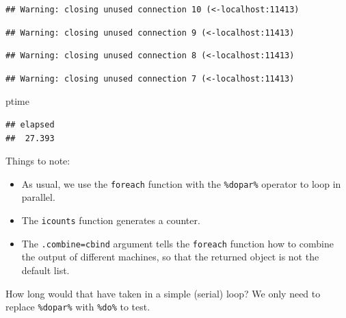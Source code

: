 \documentclass[]{book}
\newenvironment{Shaded}{\begin{snugshade}}{\end{snugshade}}
\newcommand{\KeywordTok}[1]{\textcolor[rgb]{0.13,0.29,0.53}{\textbf{{#1}}}}
\newcommand{\DataTypeTok}[1]{\textcolor[rgb]{0.13,0.29,0.53}{{#1}}}
\newcommand{\DecValTok}[1]{\textcolor[rgb]{0.00,0.00,0.81}{{#1}}}
\newcommand{\StringTok}[1]{\textcolor[rgb]{0.31,0.60,0.02}{{#1}}}
\newcommand{\OtherTok}[1]{\textcolor[rgb]{0.56,0.35,0.01}{{#1}}}
\newcommand{\NormalTok}[1]{{#1}}
\providecommand{\tightlist}{%
  \setlength{\itemsep}{0pt}\setlength{\parskip}{0pt}}
\theoremstyle{definition}
\theoremstyle{definition}
\theoremstyle{remark}
\begin{document}
\begin{verbatim}
## Warning: closing unused connection 10 (<-localhost:11413)
\end{verbatim}

\begin{verbatim}
## Warning: closing unused connection 9 (<-localhost:11413)
\end{verbatim}

\begin{verbatim}
## Warning: closing unused connection 8 (<-localhost:11413)
\end{verbatim}

\begin{verbatim}
## Warning: closing unused connection 7 (<-localhost:11413)
\end{verbatim}

\begin{Shaded}
\begin{Highlighting}[]
\NormalTok{ptime}
\end{Highlighting}
\end{Shaded}

\begin{verbatim}
## elapsed 
##  27.393
\end{verbatim}

Things to note:

\begin{itemize}
\tightlist
\item
  As usual, we use the \texttt{foreach} function with the
  \texttt{\%dopar\%} operator to loop in parallel.
\item
  The \texttt{icounts} function generates a counter.
\item
  The \texttt{.combine=cbind} argument tells the \texttt{foreach}
  function how to combine the output of different machines, so that the
  returned object is not the default list.
\end{itemize}

How long would that have taken in a simple (serial) loop? We only need
to replace \texttt{\%dopar\%} with \texttt{\%do\%} to test.

\begin{Shaded}
\end{Shaded}
\end{document}
